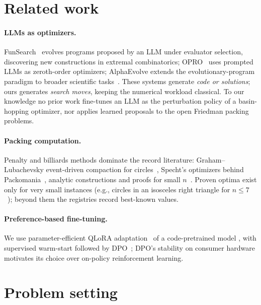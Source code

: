 \documentclass[pdflatex,sn-mathphys-num]{sn-jnl}
\theoremstyle{thmstyleone}%
\begin{document}
\section{Related work}\label{sec:related}

\paragraph{LLMs as optimizers.} FunSearch~\cite{romeraparedes2024funsearch}
evolves programs proposed by an LLM under evaluator selection, discovering
new constructions in extremal combinatorics; OPRO~\cite{yang2024opro} uses
prompted LLMs as zeroth-order optimizers; AlphaEvolve extends the
evolutionary-program paradigm to broader scientific
tasks~\cite{novikov2025alphaevolve}. These systems generate \emph{code or
solutions}; ours generates \emph{search moves}, keeping the numerical
workload classical. To our knowledge no prior work fine-tunes an LLM as the
perturbation policy of a basin-hopping optimizer, nor applies learned
proposals to the open Friedman packing problems.

\paragraph{Packing computation.} Penalty and billiards methods dominate the
record literature: Graham--Lubachevsky event-driven compaction for
circles~\cite{lubachevsky1997curved}, Specht's optimizers behind
Packomania~\cite{specht2024packomania}, analytic constructions and proofs for
small $n$~\cite{friedman2009survey,melissen1997thesis}. Proven optima exist
only for very small instances (e.g., circles in an isosceles right triangle
for $n \le 7$~\cite{xu1996circles,melissen1997thesis}); beyond them the
registries record best-known values.

\paragraph{Preference-based fine-tuning.} We use parameter-efficient QLoRA
adaptation~\cite{hu2022lora,dettmers2023qlora} of a code-pretrained model
\cite{hui2024qwen25coder}, with supervised warm-start followed by
DPO~\cite{rafailov2023dpo}; DPO's stability on consumer hardware motivates
its choice over on-policy reinforcement learning.

\section{Problem setting}\label{sec:setting}
\end{document}
